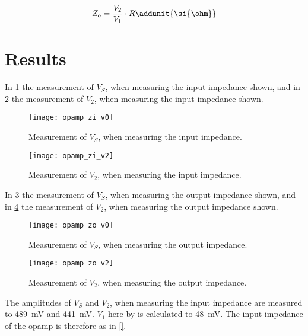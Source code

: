\begin{equation}\label{eq:opamp_zo_nom}
        Z_o = \frac{V_2}{V_1} \cdot R
        \addunit{\si{\ohm}}
    \end{equation}

    \startexplain
    \stopexplain

\section{Results}

In \ref{fig:opamp_zi_v0} the measurement of $V_S$, when measuring the input impedance shown, and in \ref{fig:opamp_zi_v2} the measurement of $V_2$, when measuring the input impedance shown. \\

\begin{figure}[hbt]
  \centering
  \texttt{[image: opamp\_zi\_v0]}
  \caption{Measurement of $V_S$, when measuring the input impedance.}
  \label{fig:opamp_zi_v0}
\end{figure}

\begin{figure}[hbt]
  \centering
  \texttt{[image: opamp\_zi\_v2]}
  \caption{Measurement of $V_2$, when measuring the input impedance.}
  \label{fig:opamp_zi_v2}
\end{figure}

In \ref{fig:opamp_zo_v0} the measurement of $V_S$, when measuring the output impedance shown, and in \ref{fig:opamp_zo_v2} the measurement of $V_2$, when measuring the output impedance shown. \\

\begin{figure}[hbt]
  \centering
  \texttt{[image: opamp\_zo\_v0]}
  \caption{Measurement of $V_S$, when measuring the output impedance.}
  \label{fig:opamp_zo_v0}
\end{figure}

\begin{figure}[hbt]
  \centering
  \texttt{[image: opamp\_zo\_v2]}
  \caption{Measurement of $V_2$, when measuring the output impedance.}
  \label{fig:opamp_zo_v2}
\end{figure}

The amplitudes of $V_S$ and $V_2$, when measuring the input impedance are measured to \SI{489}{\milli\volt} and \SI{441}{\milli\volt}. $V_1$ here by is calculated to \SI{48}{\milli\volt}. The input impedance of the \gls{opamp} is therefore as in \autoref{}.

